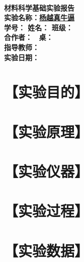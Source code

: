 \documentclass[a4paper,utf8]{article}
\begin{document}
\begin{center}
    {\mbox{}\\[7em]\bfseries\songti%
    材料科学基础实验报告}\\[34mm]
    {\bfseries\songti
    实验名称：\uline{\hfill\mbox{杨越真牛逼}\hfill} \\[2.9mm]
    学\quad 号：\uline{}\hfill
    姓\quad 名：\uline{}\hfill
    班\quad 级：\uline{} \\[2.9mm]
    合作者：\uline{\makebox[25mm]{}}\enspace~
    桌：\uline{\makebox[25mm]{}}\hfill\mbox{}\\[2.9mm]
    指导教师：\uline{\makebox[30mm]{}}\hfill\mbox{} \\[2.9mm]
    实验日期：\uline{\makebox[30mm]{}}\hfill\mbox{} \\[58.7mm]
    }
\end{center}
\newpage
\section*{【实验目的】}
\section*{【实验原理】}%
\section*{【实验仪器】}%
\section*{【实验过程】}%
\section*{【实验数据】}
\end{document}
